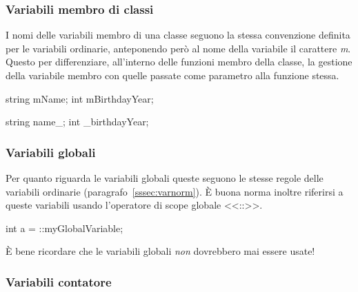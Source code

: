\subsubsection{Variabili membro di classi}

I nomi delle variabili membro di una classe seguono la stessa convenzione definita per le variabili ordinarie, anteponendo però al nome della variabile il carattere \emph{m}.
Questo per differenziare, all'interno delle funzioni membro della classe, la gestione della variabile membro con quelle passate come parametro alla funzione stessa.

\noindent\begin{minipage}[t]{\cbwidth}
\begin{RightCode}
string mName;
int mBirthdayYear;
\end{RightCode}
\end{minipage}%
\hspace{\cbdistance}
\begin{minipage}[t]{\cbwidth}
\begin{ErrorCode}
string name_;
int _birthdayYear;
\end{ErrorCode}
\end{minipage}

\subsubsection{Variabili globali}

Per quanto riguarda le variabili globali queste seguono le stesse regole delle variabili ordinarie (paragrafo~\ref{sssec:varnorm}).
È buona norma inoltre riferirsi a queste variabili usando l'operatore di scope globale <<::>>\cite{codestyle:geotechnical}.

\noindent\begin{minipage}[t]{\rbwidth}
\begin{RightCode}
int a = ::myGlobalVariable;
\end{RightCode}
\end{minipage}

È bene ricordare che le variabili globali \emph{non} dovrebbero mai essere usate!

\subsubsection{Variabili contatore}

